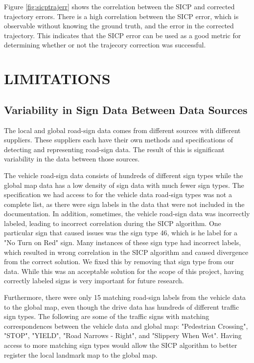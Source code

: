 \documentclass[letterpaper, 10 pt, conference]{ieeeconf}  %
\begin{document}
Figure \ref{fig:sicptrajerr} shows the correlation between the SICP and corrected trajectory errors. There is a high correlation between the SICP error, which is observable without knowing the ground truth, and the error in the corrected trajectory. This indicates that the SICP error can be used as a good metric for determining whether or not the trajecory correction was successful.

\section{LIMITATIONS}


\subsection{Variability in Sign Data Between Data Sources}
The local and global road-sign data comes from different sources with different suppliers. These suppliers each have their own methods and specifications of detecting and representing road-sign data. The result of this is significant variability in the data between those sources.

The vehicle road-sign data consists of hundreds of different sign types while the global map data has a low density of sign data with much fewer sign types. The specification we had access to for the vehicle data road-sign types was not a complete list, as there were sign labels in the data that were not included in the documentation. In addition, sometimes, the vehicle road-sign data was incorrectly labeled, leading to incorrect correlation during the SICP algorithm. One particular sign that caused issues was the sign type 46, which is he label for a "No Turn on Red" sign. Many instances of these sign type had incorrect labels, which resulted in wrong correlation in the SICP algorithm and caused divergence from the correct solution. We fixed this by removing that sign type from our data. While this was an acceptable solution for the scope of this project, having correctly labeled signs is very important for future research.

Furthermore, there were only 15 matching road-sign labels from the vehicle data to the global map, even though the drive data has hundreds of different traffic sign types. The following are some of the traffic signs with matching correspondences between the vehicle data and global map: "Pedestrian Crossing", "STOP", "YIELD", "Road Narrows - Right", and "Slippery When Wet". Having access to more matching sign types would allow the SICP algorithm to better register the local landmark map to the global map.
\end{document}
